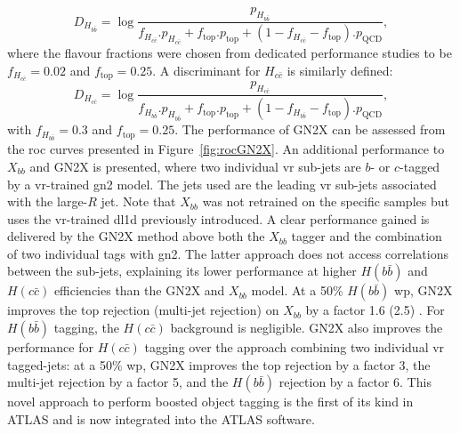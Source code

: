 \begin{equation}
  D_{H_{b\bar{b}}} = \log \frac{p_{H_{b\bar{b}}}}{f_{H_{c\bar{c}}} . p_{H_{c\bar{c}}} + f_{\textrm{top}} . p_{\textrm{top}} + (1 - f_{H_{c\bar{c}}} - f_{\textrm{top}}) . p_{\textrm{QCD}}},
\end{equation}
where the flavour fractions were chosen from dedicated performance studies to be $f_{H_{c\bar{c}}} = 0.02$ and $f_{\textrm{top}} = 0.25$. A discriminant for $H_{c\bar{c}}$ is similarly defined:
\begin{equation}
  D_{H_{c\bar{c}}} = \log \frac{p_{H_{c\bar{c}}}}{f_{H_{b\bar{b}}} . p_{H_{b\bar{b}}} + f_{\textrm{top}} . p_{\textrm{top}} + (1 - f_{H_{b\bar{b}}} - f_{\textrm{top}}) . p_{\textrm{QCD}}},
\end{equation}
with $f_{H_{b\bar{b}}} = 0.3$ and $f_{\textrm{top}} = 0.25$. The performance of GN2X can be assessed from the \gls{roc} curves presented in Figure~\ref{fig:rocGN2X}. An additional performance to $X_{bb}$ and GN2X is presented, where two individual \gls{vr} sub-jets are $b$- or $c$-tagged by a \gls{vr}-trained \gls{gn2} model. The jets used are the leading \gls{vr} sub-jets associated with the large-$R$ jet. Note that $X_{bb}$ was not retrained on the specific samples but uses the \gls{vr}-trained \gls{dl1d} previously introduced. A clear performance gained is delivered by the GN2X method above both the $X_{bb}$ tagger and the combination of two individual tags with \gls{gn2}. The latter approach does not access correlations between the sub-jets, explaining its lower performance at higher $H(b\bar{b})$ and $H(c\bar{c})$ efficiencies than the GN2X and $X_{bb}$ model. At a 50\% $H(b\bar{b})$ \gls{wp}, GN2X improves the top rejection (multi-jet rejection) on $X_{bb}$ by a factor 1.6 (2.5) \cite{ATL-PHYS-PUB-2023-021}. For $H(b\bar{b})$ tagging, the $H(c\bar{c})$ background is negligible. GN2X also improves the performance for $H(c\bar{c})$ tagging over the approach combining two individual \gls{vr} tagged-jets: at a 50\% \gls{wp}, GN2X improves the top rejection by a factor 3, the multi-jet rejection by a factor 5, and the $H(b\bar{b})$ rejection by a factor 6. This novel approach to perform boosted object tagging is the first of its kind in ATLAS and is now integrated into the ATLAS software.

